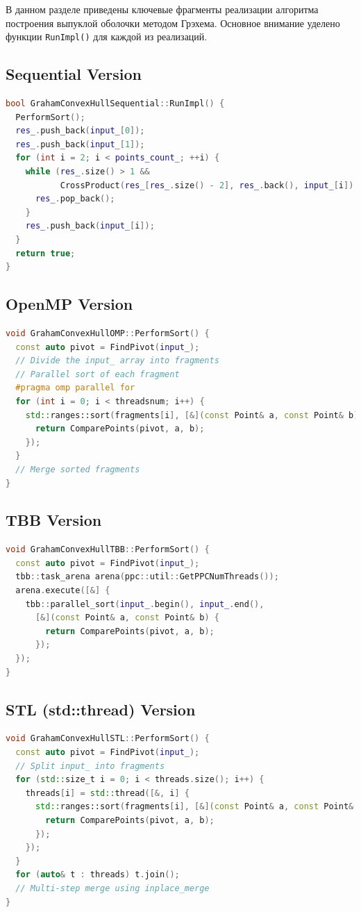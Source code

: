 \documentclass[12pt,a4paper]{extarticle}
\begin{document}
В данном разделе приведены ключевые фрагменты реализации алгоритма построения выпуклой оболочки методом Грэхема. Основное внимание уделено функции \texttt{RunImpl()} для каждой из реализаций.

\subsection{Sequential Version}
\begin{lstlisting}[language=C++]
bool GrahamConvexHullSequential::RunImpl() {
  PerformSort();
  res_.push_back(input_[0]);
  res_.push_back(input_[1]);
  for (int i = 2; i < points_count_; ++i) {
    while (res_.size() > 1 &&
           CrossProduct(res_[res_.size() - 2], res_.back(), input_[i]) <= 0) {
      res_.pop_back();
    }
    res_.push_back(input_[i]);
  }
  return true;
}
\end{lstlisting}

\subsection{OpenMP Version}
\begin{lstlisting}[language=C++]
void GrahamConvexHullOMP::PerformSort() {
  const auto pivot = FindPivot(input_);
  // Divide the input_ array into fragments
  // Parallel sort of each fragment
  #pragma omp parallel for
  for (int i = 0; i < threadsnum; i++) {
    std::ranges::sort(fragments[i], [&](const Point& a, const Point& b) {
      return ComparePoints(pivot, a, b);
    });
  }
  // Merge sorted fragments
}
\end{lstlisting}

\subsection{TBB Version}
\begin{lstlisting}[language=C++]
void GrahamConvexHullTBB::PerformSort() {
  const auto pivot = FindPivot(input_);
  tbb::task_arena arena(ppc::util::GetPPCNumThreads());
  arena.execute([&] {
    tbb::parallel_sort(input_.begin(), input_.end(),
      [&](const Point& a, const Point& b) {
        return ComparePoints(pivot, a, b);
      });
  });
}
\end{lstlisting}

\subsection{STL (std::thread) Version}
\begin{lstlisting}[language=C++]
void GrahamConvexHullSTL::PerformSort() {
  const auto pivot = FindPivot(input_);
  // Split input_ into fragments
  for (std::size_t i = 0; i < threads.size(); i++) {
    threads[i] = std::thread([&, i] {
      std::ranges::sort(fragments[i], [&](const Point& a, const Point& b) {
        return ComparePoints(pivot, a, b);
      });
    });
  }
  for (auto& t : threads) t.join();
  // Multi-step merge using inplace_merge
}
\end{lstlisting}
\end{document}
